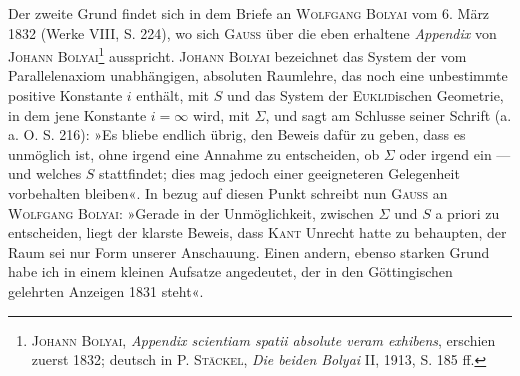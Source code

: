 Der zweite Grund findet sich in dem Briefe an \textsc{Wolfgang Bolyai} vom
6. März 1832 (Werke VIII, S. 224), wo sich \textsc{Gauss} über die eben erhaltene
\textit{Appendix} von \textsc{Johann Bolyai}\footnote{\textsc{Johann Bolyai}, \textit{Appendix scientiam spatii absolute veram exhibens}, erschien zuerst 1832; deutsch in \textsc{P. Stäckel}, \textit{Die beiden Bolyai} II, 1913, S. 185 ff.} ausspricht. \textsc{Johann Bolyai} bezeichnet das
System der vom Parallelenaxiom unabhängigen, absoluten Raumlehre, das
noch eine unbestimmte positive Konstante \(i\) enthält, mit \(S\) und das System
der \textsc{Euklid}ischen Geometrie, in dem jene Konstante \(i=\infty\) wird, mit \(\Sigma\), und
sagt am Schlusse seiner Schrift (a. a. O. S. 216): »Es bliebe endlich übrig,
den Beweis dafür zu geben, dass es unmöglich ist, ohne irgend eine Annahme
zu entscheiden, ob \(\Sigma\) oder irgend ein — und welches \(S\) stattfindet; dies mag
jedoch einer geeigneteren Gelegenheit vorbehalten bleiben«. In bezug auf
diesen Punkt schreibt nun \textsc{Gauss} an \textsc{Wolfgang Bolyai}: »Gerade in der Unmöglichkeit,
zwischen \(\Sigma\) und \(S\) a priori zu entscheiden, liegt der klarste Beweis,
dass \textsc{Kant} Unrecht hatte zu behaupten, der Raum sei nur Form unserer
Anschauung. Einen andern, ebenso starken Grund habe ich in einem kleinen
Aufsatze angedeutet, der in den Göttingischen gelehrten Anzeigen 1831 steht«.

